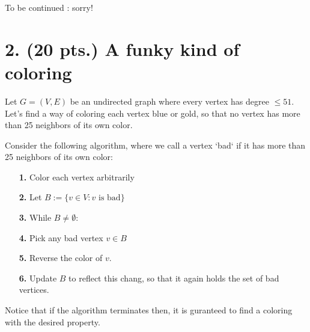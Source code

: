 \documentclass[11pt]{article}
\begin{document}
To be continued : sorry!
\label{pg:end-of-p1}
%

\newpage

\pagestyle{plain}

\section*{2. (20 pts.) A funky kind of coloring}

Let $G = (V,E)$ be an undirected graph where every vertex has degree $\leq 51$. 
Let's find a way of coloring each vertex blue or gold, so that no vertex
has more than 25 neighbors of its own color.

Consider the following algorithm, where we call a vertex `bad` if it
has more than 25 neighbors of its own color:

\begin{itemize}  
\item[{\bf 1.}] Color each vertex arbitrarily 
\item[{\bf 2.}] Let $B := \{v \in V : v \mbox{ is bad}\}$
\item[{\bf 3.}] While $B \not= \emptyset:$
\item[{\bf 4.}] \hspace{4 pt}    Pick any bad vertex $v \in B$
\item[{\bf 5.}] \hspace{4 pt}    Reverse the color of $v$.
\item[{\bf 6.}] \hspace{4 pt}    Update $B$ to reflect this chang,
so that it again holds the set of bad vertices.
\end{itemize}

Notice that if the algorithm terminates then, it is 
guranteed to find a coloring with the desired property.
\end{document}
